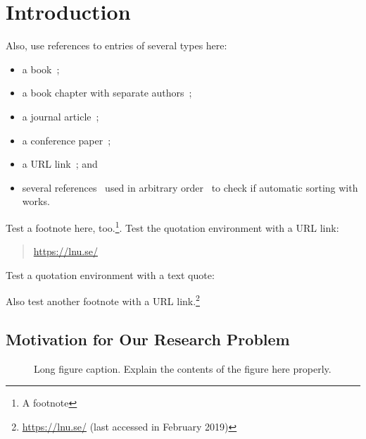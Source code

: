 \chapter{Introduction}\label{ch:introduction}

\chaptertoc

\noindent \kant[7-8]

Also, use references to entries of several types here: 
\begin{itemize}
\item a book~\cite{Card1999};
\item a book chapter with separate authors~\cite{Fekete2008};
\item a journal article~\cite{VanWijk2006a};
\item a conference paper~\cite{Shneiderman1996};
\item a URL link~\cite{ColorBrewer}; and
\item several references~\cite{Shneiderman1996,Card1999,VanWijk2006a,Fekete2008,ColorBrewer} used in arbitrary order~\cite{VanWijk2006a,ColorBrewer} to check if automatic sorting with  works.
\end{itemize}

\noindent Test a footnote here, too.\footnote{A footnote}. 
Test the quotation environment with a URL link:
\begin{quotation}
\centering
\url{https://lnu.se/}
\end{quotation}

\noindent Test a quotation environment with a text quote:
\begin{quote}
\emph{}
\end{quote} 
\noindent Also test another footnote with a URL link.\footnote{\url{https://lnu.se/} (last accessed in February 2019)}


\section[Motivation for Our Problem]{Motivation for Our Research Problem%
%
}\label{sec:intro-motivation}

\begin{figure}[t!]
\centering
    \figbox{\rule{.1pt}{2cm} \rule[1cm]{2cm}{.1pt} \rule{.1pt}{2cm}}
	\caption[Short caption for example figure]{Long figure caption.
	Explain the contents of the figure here properly.}%
	\label{fig:introduction-example}%
\end{figure} 

